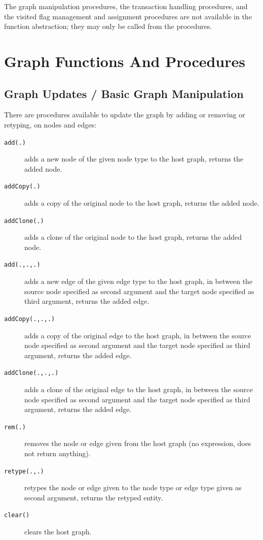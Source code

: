 The graph manipulation procedures, the transaction handling procedures, and the visited flag management and assignment procedures are not available in the function abstraction; they may only be called from the procedures.

\section{Graph Functions And Procedures}\label{neighbouringelementsfunctions}

\subsection{Graph Updates / Basic Graph Manipulation}

There are procedures available to update the graph by adding or removing or retyping, on nodes and edges:

\begin{description}
\item[\texttt{add(.)}] adds a new node of the given node type to the host graph, returns the added node.
\item[\texttt{addCopy(.)}] adds a copy of the original node to the host graph, returns the added node.
\item[\texttt{addClone(.)}] adds a clone of the original node to the host graph, returns the added node.
\item[\texttt{add(.,.,.)}] adds a new edge of the given edge type to the host graph, in between the source node specified as second argument and the target node specified as third argument, returns the added edge.
\item[\texttt{addCopy(.,.,.)}] adds a copy of the original edge to the host graph, in between the source node specified as second argument and the target node specified as third argument, returns the added edge.
\item[\texttt{addClone(.,.,.)}] adds a clone of the original edge to the host graph, in between the source node specified as second argument and the target node specified as third argument, returns the added edge.
\item[\texttt{rem(.)}] removes the node or edge given from the host graph (no expression, does not return anything).
\item[\texttt{retype(.,.)}] retypes the node or edge given to the node type or edge type given as second argument, returns the retyped entity.
\item[\texttt{clear()}] clears the host graph.
\end{description}

